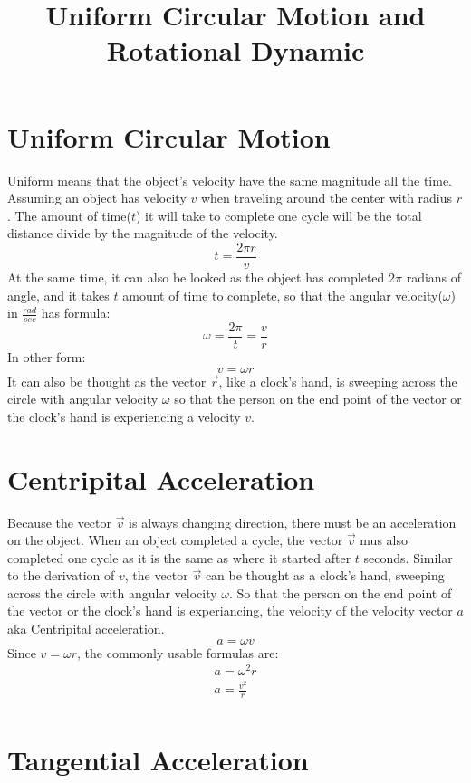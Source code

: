 \documentclass[]{article}
\title{Uniform Circular Motion and Rotational Dynamic}
\author{}
\begin{document}
    \maketitle
    \section{Uniform Circular Motion}\label{sec:uniform-circular-motion}
        Uniform means that the object's velocity have the same magnitude all
        the time. Assuming an object has velocity $v$ when traveling around
        the center with radius $r$. The amount of time($t$) it will take to
        complete one cycle will be the total distance divide by the magnitude of
        the velocity.
            \[t = \frac{2\pi r}{v} \]
        At the same time, it can also be looked as the object has completed $2\pi$ radians of angle,
        and it takes $t$ amount of time to complete, so that the angular
        velocity($\omega$) in $\frac{rad}{sec}$ has formula:
            \[\omega = \frac{2\pi}{t} = \frac{v}{r}\]
        In other form:
            \[v = \omega r\]
        It can also be thought as the vector $\vec{r}$, like a clock's hand, is
        sweeping across the circle with angular velocity $\omega$ so that the
        person on the end point of the vector or the clock's hand is
        experiencing a velocity $v$.
    \section{Centripital Acceleration}\label{sec:centripital-acceleration}
        Because the vector $\vec{v}$ is always changing direction, there
    must be an acceleration on the object. When an object completed a cycle,
    the vector $\vec{v}$ mus also completed one cycle as it is the same as
    where it started after $t$ seconds. Similar to the derivation of $v$, the
    vector $\vec{v}$ can be thought as a clock's hand, sweeping across the circle with
    angular velocity $\omega$. So that the person on the end point of the
    vector or the clock's hand is experiancing, the velocity of the velocity
    vector $a$ aka Centripital acceleration.
    \[a = \omega v\]
    Since $v = \omega r $, the commonly usable formulas are:
        \begin{gather*}
            a = \omega ^2 r\\
            a = \frac{v^2}{r}\\
        \end{gather*}
    \section{Tangential Acceleration}
\end{document}
